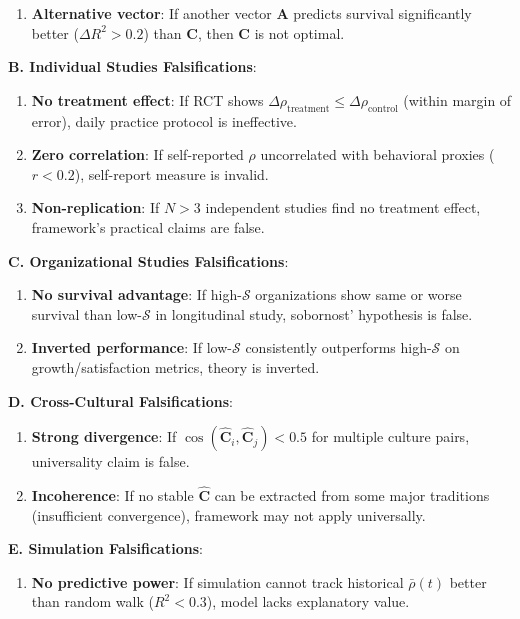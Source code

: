\documentclass[11pt,a4paper]{article}
\theoremstyle{definition}
\theoremstyle{remark}
\begin{document}
\begin{enumerate}
\begin{mdframed}[backgroundcolor=red!10,linewidth=2pt,linecolor=red!70!black]
\begin{enumerate}
    \item \textbf{Alternative vector}: If another vector \(\mathbf{A}\) predicts survival significantly better (\(\Delta R^2 > 0.2\)) than \(\mathbf{C}\), then \(\mathbf{C}\) is not optimal.
\end{enumerate}

\textbf{B. Individual Studies Falsifications}:
\begin{enumerate}
    \item \textbf{No treatment effect}: If RCT shows \(\Delta\rho_{\text{treatment}} \leq \Delta\rho_{\text{control}}\) (within margin of error), daily practice protocol is ineffective.
    
    \item \textbf{Zero correlation}: If self-reported \(\rho\) uncorrelated with behavioral proxies (\(r < 0.2\)), self-report measure is invalid.
    
    \item \textbf{Non-replication}: If \(N > 3\) independent studies find no treatment effect, framework's practical claims are false.
\end{enumerate}

\textbf{C. Organizational Studies Falsifications}:
\begin{enumerate}
    \item \textbf{No survival advantage}: If high-\(\mathcal{S}\) organizations show same or worse survival than low-\(\mathcal{S}\) in longitudinal study, sobornost' hypothesis is false.
    
    \item \textbf{Inverted performance}: If low-\(\mathcal{S}\) consistently outperforms high-\(\mathcal{S}\) on growth/satisfaction metrics, theory is inverted.
\end{enumerate}

\textbf{D. Cross-Cultural Falsifications}:
\begin{enumerate}
    \item \textbf{Strong divergence}: If \(\cos(\hat{\mathbf{C}}_i, \hat{\mathbf{C}}_j) < 0.5\) for multiple culture pairs, universality claim is false.
    
    \item \textbf{Incoherence}: If no stable \(\hat{\mathbf{C}}\) can be extracted from some major traditions (insufficient convergence), framework may not apply universally.
\end{enumerate}

\textbf{E. Simulation Falsifications}:
\begin{enumerate}
    \item \textbf{No predictive power}: If simulation cannot track historical \(\bar{\rho}(t)\) better than random walk (\(R^2 < 0.3\)), model lacks explanatory value.
    

\end{enumerate}
\end{mdframed}
\end{enumerate}
\end{document}
